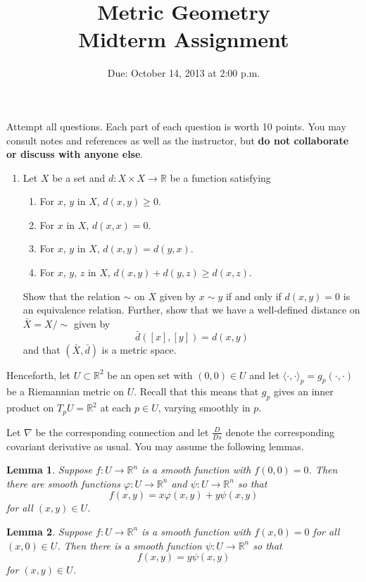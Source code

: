 \documentclass[11pt]{article}
\newcommand{\R}{\mathbb{R}}
\newtheorem{lemma}{Lemma}
\theoremstyle{remark}
\begin{document}
\title{Metric Geometry\\
Midterm Assignment} 
\date{Due: October 14, 2013 at 2:00 p.m.}
\maketitle

\thispagestyle{empty}

Attempt all questions. Each part of each question is worth 10 points. You may consult notes
and references as well as the instructor, but \textbf{do not collaborate or
discuss with anyone else}.

\begin{enumerate}
\item Let $X$ be a set and $d: X \times X \to \R$ be a function satisfying
\begin{enumerate}
 \item For $x$, $y$ in $X$, $d(x, y)\geq 0$.
 \item For $x$ in $X$, $d(x, x)=0$.
 \item For $x$, $y$ in $X$, $d(x, y)= d(y,x)$.
 \item For $x$, $y$, $z$ in $X$, $d(x, y) + d(y,z)\geq d(x, z)$.
\end{enumerate}
Show that the relation $\sim$ on $X$ given by $x\sim y$ if and only if
$d(x,y)=0$ 
is an equivalence relation. Further, show that we have a well-defined distance
on $\bar{X}=X/\sim$ given by
$$\bar{d}([x], [y]) = d(x,y)$$ 
and that $(\bar{X}, \bar{d})$ is a metric space.

\end{enumerate}

Henceforth, let $U\subset \R^2$ be an open set with $(0,0)\in U$ and let
$\langle\cdot,\cdot\rangle_p = g_p(\cdot,\cdot)$ be a Riemannian metric on $U$.
Recall that this means that $g_p$ gives an inner product on $T_p U =\R^2$ at
each $p\in U$, varying smoothly in $p$.

Let $\nabla$ be the corresponding connection and let $\frac{D}{Ds}$ denote the
corresponding covariant derivative as usual. You may assume the following
lemmas.

\begin{lemma}
 Suppose $f:U\to \R^n$ is a smooth function with $f(0,0)=0$. Then there are
smooth functions $\varphi: U\to \R^n$ and $\psi: U\to \R^n$ so that 
$$f(x,y) = x\varphi(x,y) + y \psi(x,y)$$
for all $(x,y)\in U$.
\end{lemma}

\begin{lemma}
 Suppose $f:U\to \R^n$ is a smooth function with $f(x,0)=0$ for all $(x,0)\in U$.
Then there is a smooth function $\psi: U\to \R^n$ so that 
$$f(x,y) = y \psi(x,y)$$
for $(x,y)\in U$.
\end{lemma}
\end{document}
